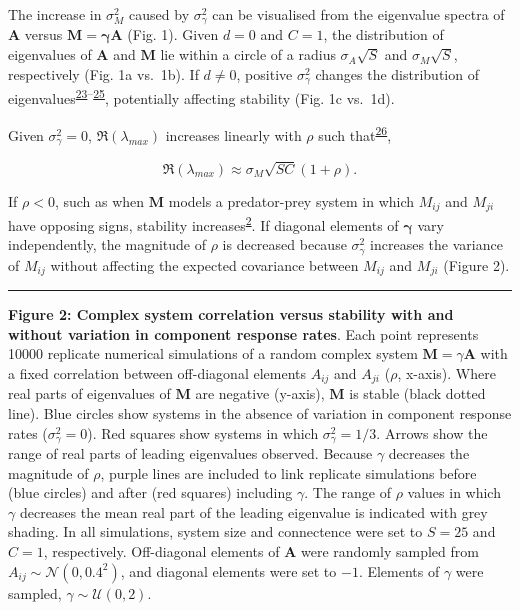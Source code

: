 \documentclass[]{article}
\begin{document}
The increase in \(\sigma^{2}_{M}\) caused by \(\sigma^{2}_\gamma\) can
be visualised from the eigenvalue spectra of \(\textbf{A}\) versus
\(\textbf{M} = \boldsymbol{\gamma}\textbf{A}\) (Fig. 1). Given \(d = 0\)
and \(C = 1\), the distribution of eigenvalues of \(\textbf{A}\) and
\(\textbf{M}\) lie within a circle of a radius \(\sigma_{A}\sqrt{S}\)
and \(\sigma_{M}\sqrt{S}\), respectively (Fig. 1a vs.~1b). If
\(d \neq 0\), positive \(\sigma^{2}_\gamma\) changes the distribution of
eigenvalues\textsuperscript{\protect\hyperlink{ref-Ahmadian2015}{23}--\protect\hyperlink{ref-Stone2017}{25}},
potentially affecting stability (Fig. 1c vs.~1d).

Given \(\sigma^{2}_\gamma = 0\), \(\Re(\lambda_{max})\) increases
linearly with \(\rho\) such
that\textsuperscript{\protect\hyperlink{ref-Tang2014c}{26}},

\begin{equation} 
\Re(\lambda_{max}) \approx \sigma_{M}\sqrt{SC}\left(1 + \rho\right). \nonumber
\end{equation}

If \(\rho < 0\), such as when \(\textbf{M}\) models a predator-prey
system in which \(M_{ij}\) and \(M_{ji}\) have opposing signs, stability
increases\textsuperscript{\protect\hyperlink{ref-Allesina2012}{2}}. If
diagonal elements of \(\boldsymbol{\gamma}\) vary independently, the
magnitude of \(\rho\) is decreased because \(\sigma^{2}_{\gamma}\)
increases the variance of \(M_{ij}\) without affecting the expected
covariance between \(M_{ij}\) and \(M_{ji}\) (Figure 2).

\vspace{2mm}
\hrule
\vspace{2mm}

\textbf{Figure 2: Complex system correlation versus stability with and
without variation in component response rates}. Each point represents
10000 replicate numerical simulations of a random complex system
\(\mathbf{M} = \gamma \mathbf{A}\) with a fixed correlation between
off-diagonal elements \(A_{ij}\) and \(A_{ji}\) (\(\rho\), x-axis).
Where real parts of eigenvalues of \(\mathbf{M}\) are negative (y-axis),
\(\mathbf{M}\) is stable (black dotted line). Blue circles show systems
in the absence of variation in component response rates
(\(\sigma^{2}_{\gamma} = 0\)). Red squares show systems in which
\(\sigma^{2}_{\gamma} = 1/3\). Arrows show the range of real parts of
leading eigenvalues observed. Because \(\gamma\) decreases the magnitude
of \(\rho\), purple lines are included to link replicate simulations
before (blue circles) and after (red squares) including \(\gamma\). The
range of \(\rho\) values in which \(\gamma\) decreases the mean real
part of the leading eigenvalue is indicated with grey shading. In all
simulations, system size and connectence were set to \(S = 25\) and
\(C = 1\), respectively. Off-diagonal elements of \(\textbf{A}\) were
randomly sampled from \(A_{ij} \sim \mathcal{N}(0, 0.4^{2})\), and
diagonal elements were set to \(-1\). Elements of \(\gamma\) were
sampled, \(\gamma \sim \mathcal{U}(0, 2)\).
\end{document}

